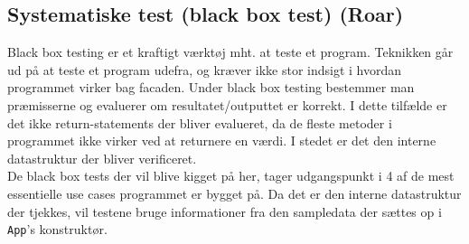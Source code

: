 \subsection{Systematiske test (black box test) (Roar)}

Black box testing er et kraftigt værktøj mht. at teste et program. Teknikken går ud på at teste et program udefra, og kræver ikke stor indsigt i hvordan programmet virker bag facaden. Under black box testing bestemmer man præmisserne og evaluerer om resultatet/outputtet er korrekt. I dette tilfælde er det ikke return-statements der bliver evalueret, da de fleste metoder i programmet ikke virker ved at returnere en værdi. I stedet er det den interne datastruktur der bliver verificeret. \\

De black box tests der vil blive kigget på her, tager udgangspunkt i 4 af de mest essentielle use cases programmet er bygget på. Da det er den interne datastruktur der tjekkes, vil testene bruge informationer fra den sampledata der sættes op i \texttt{App}'s konstruktør.

